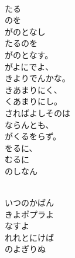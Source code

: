 \documentclass[10pt,b5j]{tarticle} %
\begin{document}
\vspace{1.5em} %
\newcommand{\linespace}{0.5em} %
\newcommand{\blocksize}{0.5\hsize} %
\newcommand{\itemmargin}{6em} %
\begin{enumerate} %
    \setlength{\itemindent}{\itemmargin} %
    \begin{minipage}[c]{\blocksize}
    
        \vspace{\linespace}
        \item~\\
        たる\\
        のを\\
        がのとなし\\
        たるのを\\
        がのとなす。\\
        がよにでよ、\\
        きよりでんかな。\\
        きあまりにく、\\
        くあまりにし。\\
        さればよしそのは\\
        ならんとも、\\
        がくるをらず。\\
        をるに、\\
        むるに\\
        のしなん
        
        \vspace{\linespace}
        \item~\\
        いつのかばん\\
        きよポプラよ\\
        なすよ\\
        れれとにけば\\
        のよぎりぬ
        

\end{minipage}
\end{enumerate}
\end{document}
